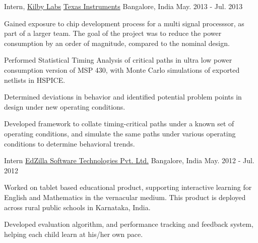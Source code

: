 \begin{cventries}
	\cventry
	{Intern, \href{http://www.ti.com/corp/docs/innovation/research-development/Kilby-Labs.html}{Kilby Labs}}
	{\href{http://www.ti.com/}{Texas Instruments}}
	{Bangalore, India}
	{May. 2013 - Jul. 2013}
	{
		\begin{cvitems}
		\item{Gained exposure to chip development process for a multi signal processsor, as part of a larger team. The goal of the project was to reduce the power consumption by an order of magnitude, compared to the nominal design.}
		\item{Performed Statistical Timing Analysis of critical paths in ultra low power consumption version of MSP 430, with Monte Carlo simulations of exported netlists in HSPICE.}
		\item{Determined deviations in behavior and identified potential problem points in design under new operating conditions.}
		\item{Developed framework to collate timing-critical paths under a known set of operating conditions, and simulate the same paths under various operating conditions to determine behavioral trends.}
		\end{cvitems}
	}

	\cventry
	{Intern}
	{\href{http://www.edzillasoftech.com/}{EdZilla Software Technologies Pvt. Ltd.}}
	{Bangalore, India}
	{May. 2012 - Jul. 2012}
	{
		\begin{cvitems}
		\item{Worked on tablet based educational product, supporting interactive learning for English and Mathematics in the vernacular medium. This product is deployed across rural public schools in Karnataka, India.}
		\item{Developed evaluation algorithm, and performance tracking and feedback system, helping each child learn at his/her own pace.}
		\end{cvitems}
	}

\end{cventries}
